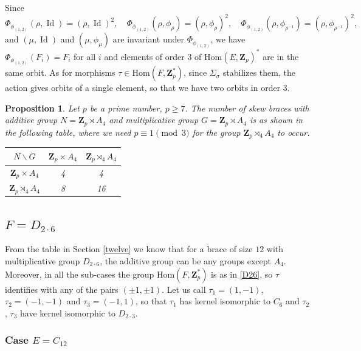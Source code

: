 \documentclass[12pt]{article}
\newtheorem{proposition}[theorem]{Proposition}
\theoremstyle{definition}
\newcommand{\Z}{\mathbf Z}
\newcommand{\Hom}{\mathrm{Hom}}
\newcommand{\Id}{\operatorname{Id}}
\begin{document}
Since
$$
\Phi_{\phi_{(1,2)}}(\rho, \Id)=(\rho,\Id)^2,\quad 
\Phi_{\phi_{(1,2)}}(\rho, \phi_{\rho})=(\rho, \phi_{\rho})^2,\quad
\Phi_{\phi_{(1,2)}}(\rho, \phi_{\rho^{-1}})=(\rho, \phi_{\rho^{-1}})^2,
$$
and $(\mu, \Id)$ and $(\mu,\phi_{\mu})$ are invariant under $\Phi_{\phi_{(1,2)}}$,
we have $\Phi_{\phi_{(1,2)}}(F_i)=F_i$ for all $i$ and elements of order 3 of $\Hom(E,\Z_p)^*$ are in the same orbit. As for morphisms $\tau\in \Hom(F,\Z_p^*)$, since $\Sigma_{\sigma}$ stabilizes them, the action
gives orbits of a single element, so that we have two orbits in order 3.

\begin{proposition}
	Let $p$ be a prime number, $p\geq 7$.
	The number of skew braces with additive group $N=\Z_p \rtimes A_4$ and multiplicative group $G=\Z_p\rtimes A_4$ is as shown in the following table, where we need $p\equiv 1 \pmod{3}$ for the group
	$\Z_p\rtimes_{4} A_4$ to occur.
	
	\begin{center}
		\begin{tabular}{|c||c|c|}
			\hline
			$N \backslash G$ & $\Z_p\times A_4$ & $\Z_p\rtimes_{4} A_4 $ \\
			\hline
			\hline
			$\Z_p\times A_4$ & 4&4 \\ \hline $\Z_p\rtimes_{4} A_4 $ &8&16\\ \hline
		\end{tabular}
	\end{center}
\end{proposition}

\subsection{$F=D_{2\cdot 6}$}

  From the table in Section \ref{twelve} we know that for a brace of size $12$ with multiplicative group $D_{2\cdot6}$, the additive group can be  any  groups except $A_4$. Moreover, in all the sub-cases the group $\Hom(F,\Z_p^*)$ is as in \ref{D26}, so $\tau$ identifies with any of the pairs $(\pm1,\pm1)$. Let us call $\tau_1=(1,-1)$, $\tau_2=(-1,-1)$ and $\tau_3=(-1,1)$, so that $\tau_1$ has kernel isomorphic to $C_6$ and $\tau_2$, $\tau_3$ have kernel isomorphic to $D_{2\cdot3}$.

\subsubsection*{Case $E=C_{12}$}
\end{document}
